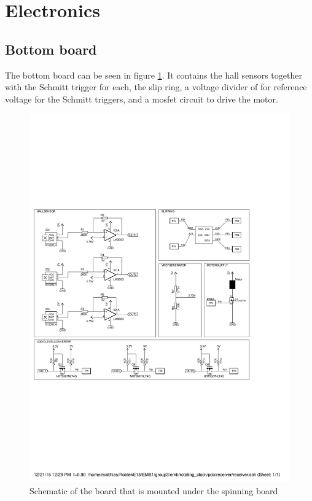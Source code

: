 \section{Electronics}

\subsection{Bottom board}
The bottom board can be seen in figure \ref{fig:botm_schematic}.
It contains the hall sensors together with the Schmitt trigger for each, the slip ring, a voltage divider of for reference voltage for the Schmitt triggers, and a mosfet circuit to drive the motor. 
\begin{figure}[h]
 \centering
 \includegraphics[scale=0.7,trim = 0 7cm 0 7cm,clip = true]{img/bottompcb_schematic}
 \caption{Schematic of the board that is mounted under the spinning board}
 \label{fig:botm_schematic}
\end{figure}

